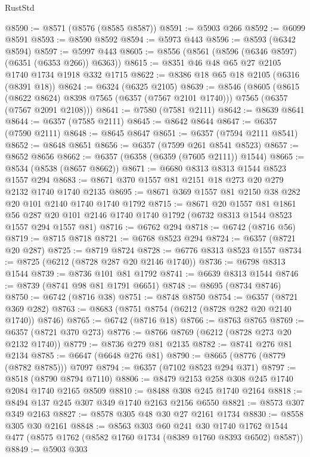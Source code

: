 \begin{lexlean}{RustStd}
\begin{coremodule}
@8590 := @8571 (@8576 (@8585 @8587))
@8591 := @5903 @266
@8592 := @6099 @8591
@8593 := @8590 @8592
@8594 := @5973 @443
@8596 := @8593 (@6342 @8594)
@8597 := @5997 @443
@8605 := @8556 (@8561 (@8596 (@6346 @8597) (@6351 (@6353 @266)) @6363))
@8615 := @8351 @46 @48 @65 @27 @2105 @1740 @1734 @1918 @332 @1715
@8622 := @8386 @18 @65 @18 @2105 (@6316 (@8391 @18))
@8624 := @6324 (@6325 @2105)
@8639 := @8546
    (@8605
      (@8615 (@8622 @8624) @8398 @7565 (@6357 (@7567 @2101 @1740)))
      @7565
      (@6357 (@7567 @2091 @2108)))
@8641 := @7580 (@7581 @2111)
@8642 := @8639 @8641
@8644 := @6357 (@7585 @2111)
@8645 := @8642 @8644
@8647 := @6357 (@7590 @2111)
@8648 := @8645 @8647
@8651 := @6357 (@7594 @2111 @8541)
@8652 := @8648 @8651
@8656 := @6357 (@7599 @261 @8541 @8523)
@8657 := @8652 @8656
@8662 := @6357 (@6358 (@6359 (@7605 @2111)) @1544)
@8665 := @8534 (@8538 (@8657 @8662))
@8671 := @6680 @8313 @8313 @1544 @8523 @1557 @294
@8683 := @8671 @370 @1557 @81 @2151 @18 @273 @20 @279 @2132 @1740 @1740 @2135
@8695 := @8671 @369 @1557 @81 @2150 @38 @282 @20 @101 @2140 @1740 @1740 @1792
@8715 := @8671
    @20
    @1557
    @81
    @1861
    @56
    @287
    @20
    @101
    @2146
    @1740
    @1740
    @1792
    (@6732 @8313 @1544 @8523 @1557 @294 @1557 @81)
@8716 := @6762 @294
@8718 := @6742 (@8716 @56)
@8719 := @8715 @8718
@8721 := @6768 @8523 @294
@8724 := @6357 (@8721 @20 @287)
@8725 := @8719 @8724
@8728 := @6776 @8313 @8523 @1557
@8734 := @8725 (@6212 (@8728 @287 @20 @2146 @1740))
@8736 := @6798 @8313 @1544
@8739 := @8736 @101 @81 @1792
@8741 := @6639 @8313 @1544
@8746 := @8739 (@8741 @98 @81 @1791 @6651)
@8748 := @8695 (@8734 @8746)
@8750 := @6742 (@8716 @38)
@8751 := @8748 @8750
@8754 := @6357 (@8721 @369 @282)
@8763 := @8683 (@8751 @8754 (@6212 (@8728 @282 @20 @2140 @1740)) @8746)
@8765 := @6742 (@8716 @18)
@8766 := @8763 @8765
@8769 := @6357 (@8721 @370 @273)
@8776 := @8766 @8769 (@6212 (@8728 @273 @20 @2132 @1740))
@8779 := @8736 @279 @81 @2135
@8782 := @8741 @276 @81 @2134
@8785 := @6647 (@6648 @276 @81)
@8790 := @8665 (@8776 (@8779 (@8782 @8785))) @7097
@8794 := @6357 (@7102 @8523 @294 @371)
@8797 := @8518 (@8790 @8794 @7110)
@8806 := @8479 @2153 @258 @308 @245 @1740 @2084 @1740 @2165 @8509
@8810 := @8488 @308 @245 @1740 @2164
@8818 := @8494 @137 @245 @307 @349 @1740 @2163 @2156 @6550
@8821 := @8573 @307 @349 @2163
@8827 := @8578 @305 @48 @30 @27 @2161 @1734
@8830 := @8558 @305 @30 @2161
@8848 := @8563
    @303
    @60
    @241
    @30
    @1740
    @1762
    @1544
    @477
    (@8575 @1762 (@8582 @1760 @1734 (@8389 @1760 @8393 @6502) @8587))
@8849 := @5903 @303

\end{coremodule}
\end{lexlean}
